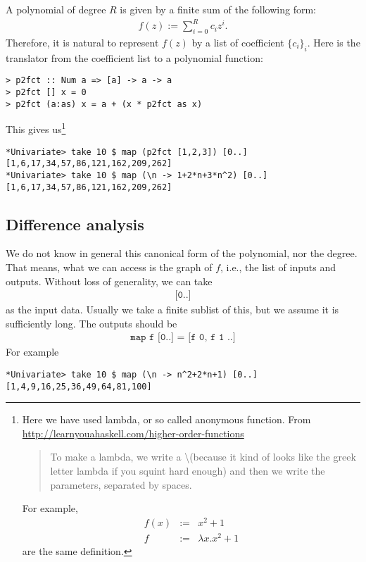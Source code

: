 \documentclass[11pt]{book}
\begin{document}
A polynomial of degree $R$ is given by a finite sum of the following form:
\begin{eqnarray}
f(z) := \sum_{i=0}^R c_i z^i.
\end{eqnarray}
Therefore, it is natural to represent $f(z)$ by a list of coefficient $\{c_i\}_i$.
Here is the translator from the coefficient list to a polynomial function:
\begin{verbatim}
> p2fct :: Num a => [a] -> a -> a
> p2fct [] x = 0
> p2fct (a:as) x = a + (x * p2fct as x)
\end{verbatim}
This gives us\footnote{
Here we have used lambda, or so called anonymous function.
From\\
\url{http://learnyouahaskell.com/higher-order-functions}
\begin{quote}
To make a lambda, we write a \textbackslash (because it kind of looks like the greek letter lambda if you squint hard enough) and then we write the parameters, separated by spaces. 
\end{quote}
For example,
\begin{eqnarray}
f(x) &:=& x^2 + 1 \\
f &:=& \lambda x. x^2+1
\end{eqnarray}
are the same definition.
}
\begin{verbatim}
*Univariate> take 10 $ map (p2fct [1,2,3]) [0..]
[1,6,17,34,57,86,121,162,209,262]
*Univariate> take 10 $ map (\n -> 1+2*n+3*n^2) [0..]
[1,6,17,34,57,86,121,162,209,262]
\end{verbatim}

\subsection{Difference analysis}
We do not know in general this canonical form of the polynomial, nor the degree.
That means, what we can access is the graph of $f$, i.e., the list of inputs and outputs.
Without loss of generality, we can take
\begin{eqnarray}
\texttt{[0..]}
\end{eqnarray}
as the input data.
Usually we take a finite sublist of this, but we assume it is sufficiently long.
The outputs should be
\begin{eqnarray}
\texttt{map f [0..] = [f 0, f 1 ..]}
\end{eqnarray}
For example
\begin{verbatim}
*Univariate> take 10 $ map (\n -> n^2+2*n+1) [0..]
[1,4,9,16,25,36,49,64,81,100]
\end{verbatim}
\end{document}
